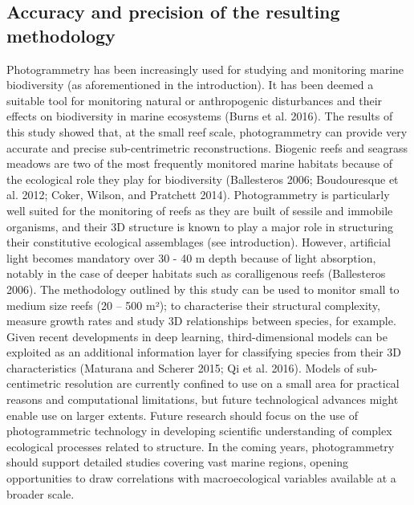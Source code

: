 \subsection{Accuracy and precision of the resulting methodology}\label{chapitre1_4.3}
Photogrammetry has been increasingly used for studying and monitoring marine biodiversity (as aforementioned in the introduction). It has been deemed a suitable tool for monitoring natural or anthropogenic disturbances and their effects on biodiversity in marine ecosystems (Burns et al. 2016). The results of this study showed that, at the small reef scale, photogrammetry can provide very accurate and precise sub-centrimetric reconstructions. 
\medskip
Biogenic reefs and seagrass meadows are two of the most frequently monitored marine habitats because of the ecological role they play for biodiversity (Ballesteros 2006; Boudouresque et al. 2012; Coker, Wilson, and Pratchett 2014). Photogrammetry is particularly well suited for the monitoring of reefs as they are built of sessile and immobile organisms, and their 3D structure is known to play a major role in structuring their constitutive ecological assemblages (see introduction). However, artificial light becomes mandatory over 30 - 40 m depth because of light absorption, notably in the case of deeper habitats such as coralligenous reefs (Ballesteros 2006). The methodology outlined by this study can be used to monitor small to medium size reefs (20 – 500 m²); to characterise their structural complexity, measure growth rates and study 3D relationships between species, for example. Given recent developments in deep learning, third-dimensional models can be exploited as an additional information layer for classifying species from their 3D characteristics (Maturana and Scherer 2015; Qi et al. 2016). Models of sub-centimetric resolution are currently confined to use on a small area for practical reasons and computational limitations, but future technological advances might enable use on larger extents. Future research should focus on the use of photogrammetric technology in developing scientific understanding of complex ecological processes related to structure. In the coming years, photogrammetry should support detailed studies covering vast marine regions, opening opportunities to draw correlations with macroecological variables available at a broader scale.


